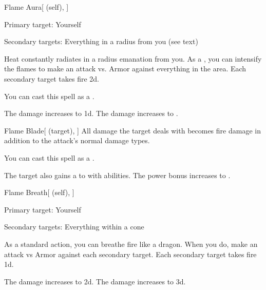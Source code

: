 \lowercase{\hypertarget{spell:Flame Aura}{}}\label{spell:Flame Aura}
\begin{attuneability}[Rank 4]{\hypertarget{spell:Flame Aura}{Flame Aura}}[ (self), ]

Primary target: Yourself
\par\noindent
Secondary targets: Everything in a \areasmall radius from you (see text)

Heat constantly radiates in a \areasmall radius emanation from you.
As a , you can intensify the flames to make an attack vs. Armor against everything in the area.
\hit Each secondary target takes fire  \minus2d.

You can cast this spell as a .

\rankline
{} The damage increases to  \minus1d.
 The damage increases to .
\end{attuneability}
\vspace{0.25em}



\lowercase{\hypertarget{spell:Flame Blade}{}}\label{spell:Flame Blade}
\begin{attuneability}[Rank 4]{\hypertarget{spell:Flame Blade}{Flame Blade}}[ (target), ]
All damage the target deals with  becomes fire damage in addition to the attack's normal damage types.

You can cast this spell as a .

\rankline
{} The target also gains a   to  with  abilities.
 The power bonus increases to .
\end{attuneability}
\vspace{0.25em}



\lowercase{\hypertarget{spell:Flame Breath}{}}\label{spell:Flame Breath}
\begin{attuneability}[Rank 4]{\hypertarget{spell:Flame Breath}{Flame Breath}}[ (self), ]

Primary target: Yourself
\par\noindent
Secondary targets: Everything within a \arealarge cone

As a standard action, you can breathe fire like a dragon.
When you do, make an attack vs Armor against each secondary target.
\hit Each secondary target takes fire  \plus1d.

\rankline
{} The damage increases to  \plus2d.
 The damage increases to  \plus3d.
\end{attuneability}
\vspace{0.25em}



